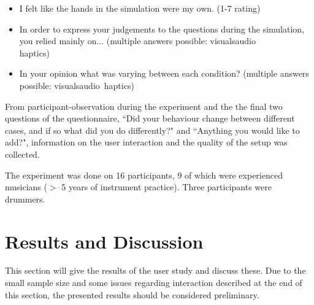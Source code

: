     \begin{itemize}
        \item I felt like the hands in the simulation were my own. (1-7 rating)
        \item In order to express your judgements to the questions during the simulation, you relied mainly on... (multiple answers possible: visuals\textbar audio\textbar\\
         haptics)
        \item In your opinion what was varying between each condition? (multiple answers possible: visuals\textbar audio\textbar\ haptics)
    \end{itemize}
    From participant-observation during the experiment and the the final two questions of the questionnaire, ``Did your behaviour change between different cases, and if so what did you do differently?" and ``Anything you would like to add?", information on the user interaction and the quality of the setup was collected.
    
    The experiment was done on 16 participants, 9 of which were experienced musicians ($>$ 5 years of instrument practice). Three participants were drummers. 
    
    \section{Results and Discussion}\label{sec:resDisc}
    This section will give the results of the user study and discuss these. Due to the small sample size and some issues regarding interaction described at the end of this section, the presented results should be considered preliminary.
    
